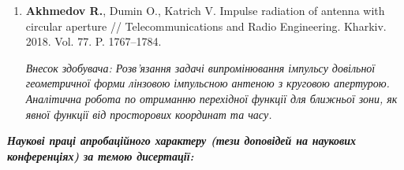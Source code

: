 \begin{enumerate}
\setcounter{enumi}{\value{ItemsInMyWriting}}

\item \textbf{Akhmedov R.}, Dumin O., Katrich V. Impulse radiation of antenna 
with circular aperture // Telecommunications and Radio Engineering. Kharkiv. 
2018. Vol. 77. P. 1767--1784.

\textit{Внесок здобувача: Розв'язання задачі випромінювання імпульсу довільної
геометричної форми лінзовою імпульсною антеною з круговою апертурою. Аналітична
робота по отриманню перехідної функції для ближньої зони, як явної функції 
від просторових координат та часу.}

\setcounter{ItemsInMyWriting}{\value{enumi}}
\end{enumerate}


\begin{center} 
\textit{\textbf{Наукові праці апробаційного характеру (тези доповідей на 
наукових конференціях) за темою дисертації:}}
\end{center}

